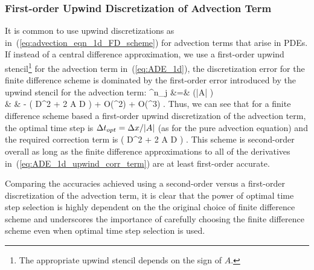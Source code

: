 \documentclass[oneeqnum,onefignum,onetabnum,onethmnum]{siamltex}
\begin{document}
\subsubsection*{First-order Upwind Discretization of Advection Term}
It is common to use upwind discretizations as 
in~(\ref{eq:advection_eqn_1d_FD_scheme}) for advection terms that arise
in PDEs.  If instead of a central difference approximation, we use a
first-order upwind stencil\footnote{The appropriate upwind stencil depends
on the sign of $A$.} for the advection term in~(\ref{eq:ADE_1d}), the 
discretization error for the finite difference scheme is dominated by the 
first-order error introduced by the upwind stencil for the advection term:
\bea
  \tau^n_j &=&
       (|A| \dt)
  \nonumber \\
   & & 
    -  
      \left( D^2   
           + 2 A D 
      \right)
      + O(\dt \dx^2) + O(\dt^3)
  \label{eq:ADE_1d_upwind_err_eqn}.
\eea
Thus, we can see that for a finite difference scheme based a first-order
upwind discretization of the advection term, the optimal time step is 
$\Delta t_{opt} = \Delta x/|A|$ (as for the pure advection equation) and the required
correction term is
\beq
      \left( D^2   
           + 2 A D 
      \right)
  \label{eq:ADE_1d_upwind_corr_term}.
\eeq
This scheme is second-order overall as long as the finite difference 
approximations to all of the derivatives in~(\ref{eq:ADE_1d_upwind_corr_term})
are at least first-order accurate.

Comparing the accuracies achieved using a second-order versus a 
first-order discretization of the advection term, it is clear that 
the power of optimal time step selection is highly dependent on the 
the original choice of finite difference scheme and underscores the importance 
of carefully choosing the finite difference scheme even when optimal time
step selection is used.
\end{document}
